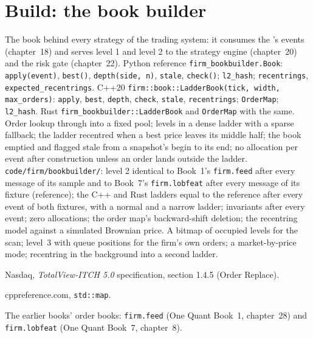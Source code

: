 \section{Build: the book builder}\label{bld:ll:the-order-book-builder:bookbuilder}

\begin{build}
 The book behind every strategy of the trading system: it consumes the 's events (chapter~18) and
serves level 1 and level 2 to the strategy engine (chapter~20) and the risk gate (chapter~22).
 Python reference \texttt{firm\_bookbuilder.Book}: \texttt{apply(event)}, \texttt{best()},
\texttt{depth(side, n)}, \texttt{stale}, \texttt{check()}; \texttt{l2\_hash}; \texttt{recentrings},
\texttt{expected\_recentrings}. C++20 \texttt{firm::book::LadderBook(tick, width, max\_orders)}: \texttt{apply},
\texttt{best}, \texttt{depth}, \texttt{check}, \texttt{stale}, \texttt{recentrings}; \texttt{OrderMap}; \texttt{l2\_hash}. Rust
\texttt{firm\_bookbuilder::LadderBook} and \texttt{OrderMap} with the same.
 Order lookup through  into a fixed pool; levels in a dense ladder with a sparse fallback; the
ladder recentred when a best price leaves its middle half; the book emptied and flagged stale from a snapshot's begin to its
end; no allocation per event after construction unless an order lands outside the ladder.
 \texttt{code/firm/bookbuilder/}: level 2 identical to Book~1's \texttt{firm.feed} after every message
of its sample and to Book~7's \texttt{firm.lobfeat} after every message of its fixture (reference); the C++ and Rust ladders equal
to the reference after every event of both fixtures, with a normal and a narrow ladder; invariants after every event; zero
allocations; the order map's backward-shift deletion; the recentring model against a simulated Brownian price.
 A bitmap of occupied levels for the scan; level~3 with queue positions for the firm's own orders; a
market-by-price mode; recentring in the background into a second ladder.
\end{build}

\begin{omsources}
\item Nasdaq, \emph{TotalView-ITCH 5.0} specification, section 1.4.5 (Order Replace).
\item cppreference.com, \texttt{std::map}.
\item The earlier books' order books: \texttt{firm.feed} (One Quant Book~1, chapter~28) and \texttt{firm.lobfeat} (One Quant
Book~7, chapter~8).
\end{omsources}

